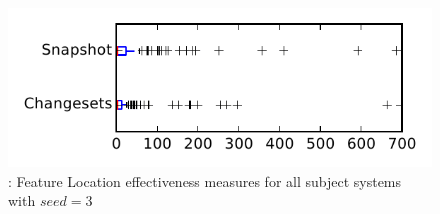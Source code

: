 
\begin{figure}
\centering
\includegraphics[height=0.4\textheight]{figures/flt_seed/rq1_tiny_3}
\caption{\rone: Feature Location effectiveness measures for all subject systems with $seed=3$}
\label{fig:flt_seed:rq1:tiny}
\end{figure}
